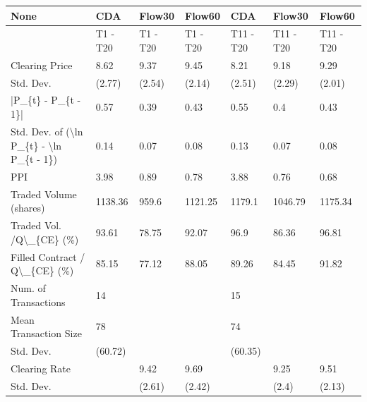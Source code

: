 \begin{tabular}{lllllll}
\hline
 None                                                      & CDA      & Flow30   & Flow60   & CDA       & Flow30    & Flow60    \\
\hline
                                                           & T1 - T20 & T1 - T20 & T1 - T20 & T11 - T20 & T11 - T20 & T11 - T20 \\
 Clearing Price                                            & 8.62     & 9.37     & 9.45     & 8.21      & 9.18      & 9.29      \\
 Std. Dev.                                                 & (2.77)   & (2.54)   & (2.14)   & (2.51)    & (2.29)    & (2.01)    \\
 |P\_\{t\} - P\_\{t - 1\}|                                       & 0.57     & 0.39     & 0.43     & 0.55      & 0.4       & 0.43      \\
 Std. Dev. of (\textbackslash{}ln P\_\{t\} - \textbackslash{}ln P\_\{t - 1\})                  & 0.14     & 0.07     & 0.08     & 0.13      & 0.07      & 0.08      \\
 PPI                                                       & 3.98     & 0.89     & 0.78     & 3.88      & 0.76      & 0.68      \\
 Traded Volume (shares)                                    & 1138.36  & 959.6    & 1121.25  & 1179.1    & 1046.79   & 1175.34   \\
 Traded Vol. /Q\textbackslash{}\_\{CE\} (\%)                                  & 93.61    & 78.75    & 92.07    & 96.9      & 86.36     & 96.81     \\
 Filled Contract / Q\textbackslash{}\_\{CE\} (\%)                             & 85.15    & 77.12    & 88.05    & 89.26     & 84.45     & 91.82     \\
 Num. of Transactions                                      & 14       &          &          & 15        &           &           \\
 Mean Transaction Size                                     & 78       &          &          & 74        &           &           \\
 Std. Dev.                                                 & (60.72)  &          &          & (60.35)   &           &           \\
 Clearing Rate                                             &          & 9.42     & 9.69     &           & 9.25      & 9.51      \\
 Std. Dev.                                                 &          & (2.61)   & (2.42)   &           & (2.4)     & (2.13)    \\

\end{tabular}
